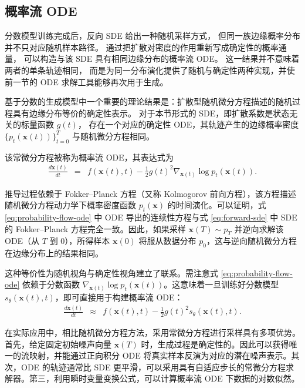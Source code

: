 \subsection{概率流 ODE}

分数模型训练完成后，反向 SDE 给出一种随机采样方式，
但同一族边缘概率分布并不只对应随机样本路径。
通过把扩散对密度的作用重新写成确定性的概率通量，
可以构造与该 SDE 具有相同边缘分布的概率流 ODE。
这一结果并不意味着两者的单条轨迹相同，
而是为同一分布演化提供了随机与确定性两种实现，并使前一节的 ODE 求解工具能够再次用于生成。

基于分数的生成模型中一个重要的理论结果是：扩散型随机微分方程描述的随机过程具有边缘分布等价的确定性表示。
对于本节形式的 SDE，即扩散系数是状态无关的标量函数 $g(t)$，
存在一个对应的确定性 ODE，其轨迹产生的边缘概率密度
$\{p_t(\mathbf{x}(t))\}_{t=0}^T$ 与随机微分方程相同。

该常微分方程被称为概率流 ODE，其表达式为
\begin{eqnarray}
\frac{d\mathbf{x}(t)}{dt} & = & f(\mathbf{x}(t), t) - \frac{1}{2}g(t)^2 \nabla_{\mathbf{x}(t)} \log p_t(\mathbf{x}(t)).
\label{eq:probability-flow-ode}
\end{eqnarray}

推导过程依赖于 Fokker--Planck 方程（又称 Kolmogorov 前向方程），该方程描述随机微分方程动力学下概率密度函数 $p_t(\mathbf{x})$ 的时间演化。可以证明，式 \eqref{eq:probability-flow-ode} 中 ODE 导出的连续性方程与式 \eqref{eq:forward-sde} 中 SDE 的 Fokker--Planck 方程完全一致。因此，如果采样 $\mathbf{x}(T) \sim p_T$ 并逆向求解该 ODE（从 $T$ 到 $0$），所得样本 $\mathbf{x}(0)$ 将服从数据分布 $p_0$，这与逆向随机微分方程在边缘分布上的结果相同。

这种等价性为随机视角与确定性视角建立了联系。需注意式 \eqref{eq:probability-flow-ode} 依赖于分数函数 $\nabla_{\mathbf{x}(t)} \log p_t(\mathbf{x}(t))$。这意味着一旦训练好分数模型 $s_\theta(\mathbf{x}(t), t)$，即可直接用于构建概率流 ODE：
\begin{eqnarray}
\frac{d\mathbf{x}(t)}{dt} & \approx & f(\mathbf{x}(t), t) - \frac{1}{2}g(t)^2 s_\theta(\mathbf{x}(t), t).
\label{eq:learned-probability-flow-ode}
\end{eqnarray}

在实际应用中，相比随机微分方程方法，采用常微分方程进行采样具有多项优势。首先，给定固定初始噪声向量 $\mathbf{x}(T)$ 时，生成过程是确定性的。因此可以获得唯一的流映射，并能通过正向积分 ODE 将真实样本反演为对应的潜在噪声表示。其次，ODE 的轨迹通常比 SDE 更平滑，可以采用具有自适应步长的常微分方程求解器。第三，利用瞬时变量变换公式，可以计算概率流 ODE 下数据的对数似然。


